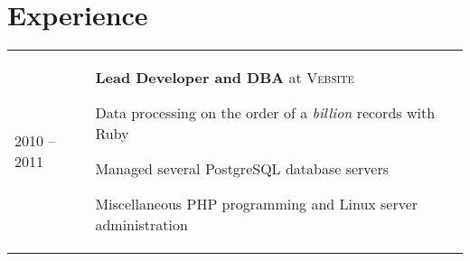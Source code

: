 \documentclass[a4paper,10pt]{article}
\newenvironment{packed-list}{
  \vspace{2pt}
  \begin{itemize}[itemsep=1pt,partopsep=0pt,leftmargin=1.5em]
    \setlength{\parskip}{0pt}
    \setlength{\partopsep}{9pt}
    \setlength{\parsep}{0pt}
    \setlength{\topsep}{0pt}
} {\end{itemize}}
\begin{document}
\section{Experience}
\begin{tabular}{p{}p{}}
  \textsc{2010 – 2011}
    & \textbf{Lead Developer and DBA} at \textsc{Vebsite}
    \begin{packed-list}
      \item{Data processing on the order of a {\em billion} records with Ruby}
      \item{Managed several PostgreSQL database servers}
      \item{Miscellaneous PHP programming and Linux server administration}
    \end{packed-list}
    \\
\end{tabular}
\vspace{-15pt}


\end{document}
